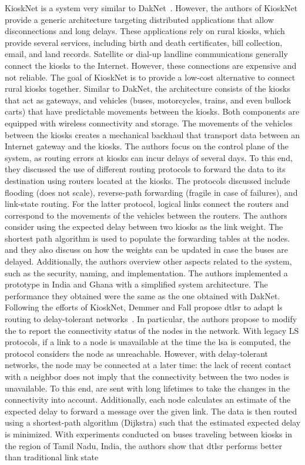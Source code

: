 KioskNet is a system very similar to DakNet~\cite{seth2006low,guo2007very,guo2011design}. However, the authors of KioskNet provide a generic architecture targeting distributed applications that allow disconnections and long delays. These applications rely on rural kiosks, which provide several services, including birth and death certificates, bill collection, email, and land records. Satellite or dial-up landline communications generally connect the kiosks to the Internet. However, these connections are expensive and not reliable.  The goal of KioskNet is to provide a low-cost alternative to connect rural kiosks together. Similar to DakNet, the architecture consists of the kiosks that act as gateways, and vehicles (\eg buses, motorcycles, trains, and even bullock carts) that have predictable movements between the kiosks. Both components are equipped with wireless connectivity and storage. The movements of the vehicles between the kiosks creates a mechanical backhaul that transport data between an Internet gateway and the kiosks. The authors focus on the control plane of the system, as routing errors at kiosks can incur delays of several days. To this end, they discussed the use of different routing protocols to forward the data to its destination using routers located at the kiosks. The protocols discussed include flooding (does not scale), reverse-path forwarding (fragile in case of failures), and link-state routing. For the latter protocol, logical links connect the routers and correspond to the movements of the vehicles between the routers. The authors consider using the expected delay between two kiosks as the link weight. The shortest path algorithm is used to populate the forwarding tables at the nodes.  and they also discuss on how the weights can be updated in case the buses are delayed. Additionally, the authors overview other aspects related to the system, such as the security, naming, and implementation. The authors implemented a prototype in India and Ghana with a simplified system architecture. The performance they obtained were the same as the one obtained with DakNet. Following the efforts of KioskNet, Demmer and Fall propose \acrfull{dtlsr} to adapt \acrfull{ls} routing to delay-tolerant networks~\cite{demmer2007dtlsr}. In particular, the authors propose to modify the  to report the connectivity status of the nodes in the network. With legacy LS protocols, if a link to a node is unavailable at the time the \Acrshort{lsa} is computed, the protocol considers the node as unreachable. However, with delay-tolerant networks, the node may be connected at a later time: the lack of recent contact with a neighbor does not imply that the connectivity between the two nodes is unavailable. To this end,  are sent with long lifetimes to take the changes in the connectivity into account. Additionally, each node calculates an estimate of the expected delay to forward a message over the given link. The data is then routed using a shortest-path algorithm (\eg Dijkstra) such that the estimated expected delay is minimized. With experiments conducted on buses traveling between kiosks in the region of Tamil Nadu, India, the authors show that \Acrshort{dtlsr} performs better than traditional link state 